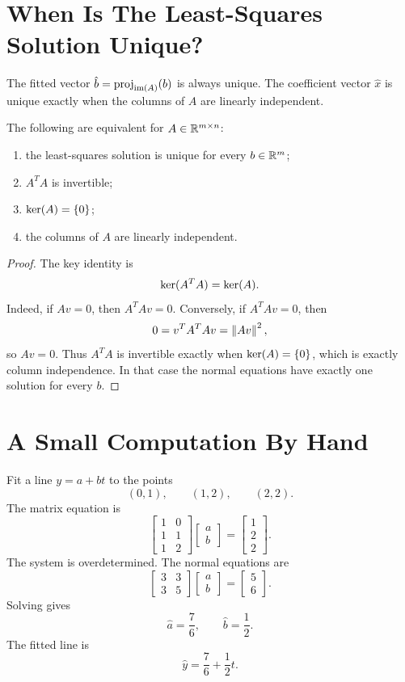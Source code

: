\section{When Is The Least-Squares Solution Unique?}

The fitted vector $\hat{b}=\operatorname{proj}_{\operatorname{im}(A)}(b)$ is always unique. The coefficient
vector $\hat{x}$ is unique exactly when the columns of $A$ are linearly
independent.

\begin{proposition}
The following are equivalent for $A\in\mathbb{R}^{m\times n}$:
\begin{enumerate}[label=(\alph*)]
  \item the least-squares solution is unique for every $b\in\mathbb{R}^m$;
  \item $A^TA$ is invertible;
  \item $\operatorname{ker}(A)=\{0\}$;
  \item the columns of $A$ are linearly independent.
\end{enumerate}
\end{proposition}

\begin{proof}
The key identity is
\[
  \operatorname{ker}(A^TA)=\operatorname{ker}(A).
\]
Indeed, if $Av=0$, then $A^TAv=0$. Conversely, if $A^TAv=0$, then
\[
  0=v^TA^TAv=\left\lVert Av \right\rVert^2,
\]
so $Av=0$. Thus $A^TA$ is invertible exactly when $\operatorname{ker}(A)=\{0\}$, which is
exactly column independence. In that case the normal equations have exactly one
solution for every $b$.
\end{proof}

\section{A Small Computation By Hand}

Fit a line $y=a+bt$ to the points
\[
  (0,1),\qquad (1,2),\qquad (2,2).
\]
The matrix equation is
\[
  \begin{bmatrix}
  1&0\\
  1&1\\
  1&2
  \end{bmatrix}
  \begin{bmatrix}a\\ b\end{bmatrix}
  =
  \begin{bmatrix}1\\2\\2\end{bmatrix}.
\]
The system is overdetermined. The normal equations are
\[
  \begin{bmatrix}
  3&3\\
  3&5
  \end{bmatrix}
  \begin{bmatrix}a\\b\end{bmatrix}
  =
  \begin{bmatrix}5\\6\end{bmatrix}.
\]
Solving gives
\[
  \hat{a}=\frac{7}{6},
  \qquad
  \hat{b}=\frac{1}{2}.
\]
The fitted line is
\[
  \hat{y}=\frac{7}{6}+\frac{1}{2}t.
\]

